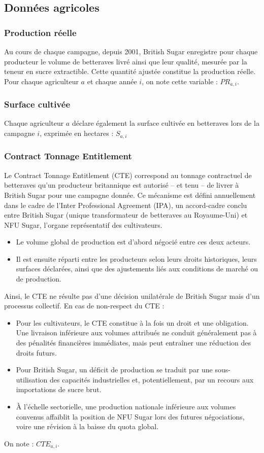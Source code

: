 \documentclass[11pt,a4paper,openright,twoside]{report}
\begin{document}
\subsection{Données agricoles}
\subsubsection{Production réelle}
Au cours de chaque campagne, depuis 2001, British Sugar enregistre pour chaque producteur le volume de betteraves livré ainsi que leur qualité, mesurée par la teneur en sucre extractible. Cette quantité ajustée constitue la production réelle.
Pour chaque agriculteur $a$ et chaque année $i$, on note cette variable :
$PR_{a,i}$.
\subsubsection{Surface cultivée}
Chaque agriculteur $a$ déclare également la surface cultivée en betteraves lors de la campagne $i$, exprimée en hectares : $S_{a,i}$

\subsubsection{Contract Tonnage Entitlement}
Le Contract Tonnage Entitlement (CTE) correspond au tonnage contractuel de betteraves qu’un producteur britannique est autorisé – et tenu – de livrer à British Sugar pour une campagne donnée.
Ce mécanisme est défini annuellement dans le cadre de l’Inter Professional Agreement (IPA), un accord-cadre conclu entre British Sugar (unique transformateur de betteraves au Royaume-Uni) et NFU Sugar, l’organe représentatif des cultivateurs.
\begin{itemize}
    \item Le volume global de production est d’abord négocié entre ces deux acteurs.
    \item Il est ensuite réparti entre les producteurs selon leurs droits historiques, leurs surfaces déclarées, ainsi que des ajustements liés aux conditions de marché ou de production.
\end{itemize}  
Ainsi, le CTE ne résulte pas d’une décision unilatérale de British Sugar mais d’un processus collectif.
En cas de non-respect du CTE :
\begin{itemize}
    \item Pour les cultivateurs, le CTE constitue à la fois un droit et une obligation. Une livraison inférieure aux volumes attribués ne conduit généralement pas à des pénalités financières immédiates, mais peut entraîner une réduction des droits futurs.
    \item Pour British Sugar, un déficit de production se traduit par une sous-utilisation des capacités industrielles et, potentiellement, par un recours aux importations de sucre brut.
    \item À l’échelle sectorielle, une production nationale inférieure aux volumes convenus affaiblit la position de NFU Sugar lors des futures négociations, voire une révision à la baisse du quota global.
\end{itemize}
On note :
 $CTE_{a,i}$.
\end{document}
